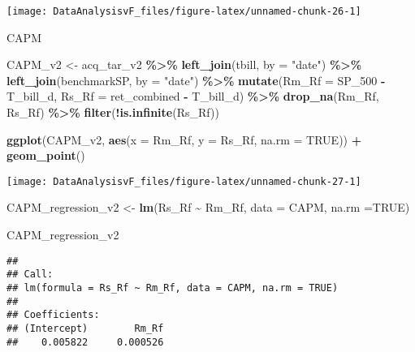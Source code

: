 \documentclass[
]{article}
\newenvironment{Shaded}{\begin{snugshade}}{\end{snugshade}}
\newcommand{\DataTypeTok}[1]{\textcolor[rgb]{0.13,0.29,0.53}{#1}}
\newcommand{\DecValTok}[1]{\textcolor[rgb]{0.00,0.00,0.81}{#1}}
\newcommand{\KeywordTok}[1]{\textcolor[rgb]{0.13,0.29,0.53}{\textbf{#1}}}
\newcommand{\NormalTok}[1]{#1}
\newcommand{\OperatorTok}[1]{\textcolor[rgb]{0.81,0.36,0.00}{\textbf{#1}}}
\newcommand{\OtherTok}[1]{\textcolor[rgb]{0.56,0.35,0.01}{#1}}
\newcommand{\StringTok}[1]{\textcolor[rgb]{0.31,0.60,0.02}{#1}}
\begin{document}
\begin{center}\texttt{[image: DataAnalysisvF\_files/figure-latex/unnamed-chunk-26-1]} \end{center}

CAPM

\begin{Shaded}
\begin{Highlighting}[]
\NormalTok{CAPM\_v2 \textless{}{-}}\StringTok{ }\NormalTok{acq\_tar\_v2 }\OperatorTok{\%\textgreater{}\%}
\StringTok{  }\KeywordTok{left\_join}\NormalTok{(tbill, }\DataTypeTok{by =} \StringTok{"date"}\NormalTok{) }\OperatorTok{\%\textgreater{}\%}
\StringTok{  }\KeywordTok{left\_join}\NormalTok{(benchmarkSP, }\DataTypeTok{by =} \StringTok{"date"}\NormalTok{) }\OperatorTok{\%\textgreater{}\%}
\StringTok{  }\KeywordTok{mutate}\NormalTok{(}\DataTypeTok{Rm\_Rf =}\NormalTok{ SP\_}\DecValTok{500} \OperatorTok{{-}}\StringTok{ }\NormalTok{T\_bill\_d,}
         \DataTypeTok{Rs\_Rf =}\NormalTok{ ret\_combined }\OperatorTok{{-}}\StringTok{ }\NormalTok{T\_bill\_d) }\OperatorTok{\%\textgreater{}\%}
\StringTok{  }\KeywordTok{drop\_na}\NormalTok{(Rm\_Rf, Rs\_Rf) }\OperatorTok{\%\textgreater{}\%}
\StringTok{  }\KeywordTok{filter}\NormalTok{(}\OperatorTok{!}\KeywordTok{is.infinite}\NormalTok{(Rs\_Rf))}

\KeywordTok{ggplot}\NormalTok{(CAPM\_v2, }\KeywordTok{aes}\NormalTok{(}\DataTypeTok{x =}\NormalTok{ Rm\_Rf, }\DataTypeTok{y =}\NormalTok{ Rs\_Rf, }\DataTypeTok{na.rm =} \OtherTok{TRUE}\NormalTok{)) }\OperatorTok{+}
\StringTok{  }\KeywordTok{geom\_point}\NormalTok{() }
\end{Highlighting}
\end{Shaded}

\begin{center}\texttt{[image: DataAnalysisvF\_files/figure-latex/unnamed-chunk-27-1]} \end{center}

\begin{Shaded}
\begin{Highlighting}[]
\NormalTok{CAPM\_regression\_v2 \textless{}{-}}\StringTok{ }\KeywordTok{lm}\NormalTok{(Rs\_Rf }\OperatorTok{\textasciitilde{}}\StringTok{ }\NormalTok{Rm\_Rf, }\DataTypeTok{data =}\NormalTok{ CAPM, }\DataTypeTok{na.rm =}\OtherTok{TRUE}\NormalTok{)}

\NormalTok{CAPM\_regression\_v2}
\end{Highlighting}
\end{Shaded}

\begin{verbatim}
## 
## Call:
## lm(formula = Rs_Rf ~ Rm_Rf, data = CAPM, na.rm = TRUE)
## 
## Coefficients:
## (Intercept)        Rm_Rf  
##    0.005822     0.000526
\end{verbatim}
\end{document}
